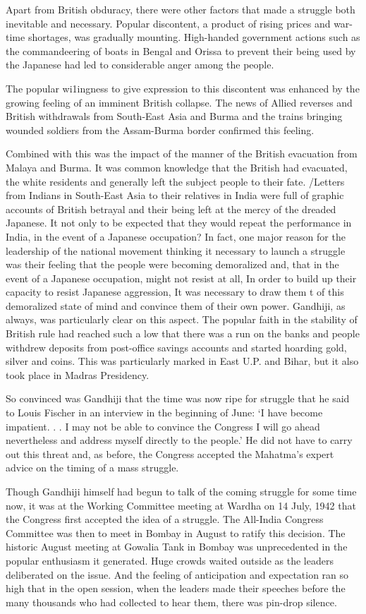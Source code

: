 Apart from British obduracy, there were other factors that made a struggle both inevitable and necessary. Popular discontent, a product of rising prices and war-time shortages, was gradually mounting. High-handed government actions such as the commandeering of boats in Bengal and Orissa to prevent their being used by the Japanese had led to considerable anger among the people.

The popular wi1ingness to give expression to this discontent was enhanced by the growing feeling of an imminent British collapse. The news of Allied reverses and British withdrawals from South-East Asia and Burma and the trains bringing wounded soldiers from the Assam-Burma border confirmed this feeling.

Combined with this was the impact of the manner of the British evacuation from Malaya and Burma. It was common knowledge that the British had evacuated, the white residents and generally left the subject people to their fate. /Letters from Indians in South-East Asia to their relatives in India were full of graphic accounts of British betrayal and their being left at the mercy of the dreaded Japanese. It not only to be expected that they would repeat the performance in India, in the event of a Japanese occupation? In fact, one major reason for the leadership of the national movement thinking it necessary to launch a struggle was their feeling that the people were becoming demoralized and, that in the event of a Japanese occupation, might not resist at all, In order to build up their capacity to resist Japanese aggression, It was necessary to draw them t of this demoralized state of mind and convince them of their own power. Gandhiji, as always, was particularly clear on this aspect. The popular faith in the stability of British rule had reached such a low that there was a run on the banks and people withdrew deposits from post-office savings accounts and started hoarding gold, silver and coins. This was particularly marked in East U.P. and Bihar, but it also took place in Madras Presidency.

So convinced was Gandhiji that the time was now ripe for struggle that he said to Louis Fischer in an interview in the beginning of June: ‘I have become impatient. . . I may not be able to convince the Congress I will go ahead nevertheless and address myself directly to the people.’ He did not have to carry out this threat and, as before, the Congress accepted the Mahatma’s expert advice on the timing of a mass struggle.

Though Gandhiji himself had begun to talk of the coming struggle for some time now, it was at the Working Committee meeting at Wardha on 14 July, 1942 that the Congress first accepted the idea of a struggle. The All-India Congress Committee was then to meet in Bombay in August to ratify this decision. The historic August meeting at Gowalia Tank in Bombay was unprecedented in the popular enthusiasm it generated. Huge crowds waited outside as the leaders deliberated on the issue. And the feeling of anticipation and expectation ran so high that in the open session, when the leaders made their speeches before the many thousands who had collected to hear them, there was pin-drop silence.

